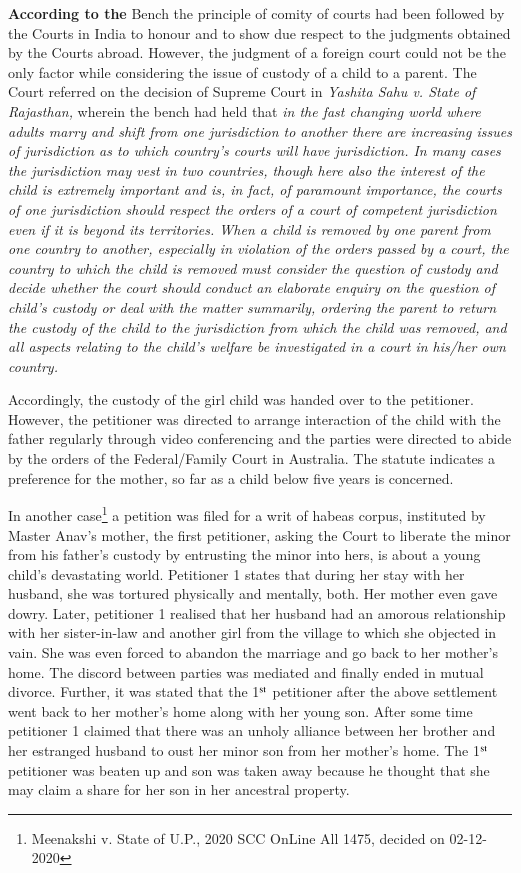 \begin{multicols}{2}
\noi
\textbf{According to the} Bench the principle of comity of courts had been followed by the Courts in
India to honour and to show due respect to the judgments obtained by the Courts abroad.
However, the judgment of a foreign court could not be the only factor while considering the issue
of custody of a child to a parent. The Court referred on the decision of Supreme Court in \textit{Yashita
Sahu v. State of Rajasthan,} wherein the bench had held that \textit{in the fast changing world where
adults marry and shift from one jurisdiction to another there are increasing issues of jurisdiction
as to which country’s courts will have jurisdiction. In many cases the jurisdiction may vest in two
countries, though here also the interest of the child is extremely important and is, in fact, of
paramount importance, the courts of one jurisdiction should respect the orders of a court of
competent jurisdiction even if it is beyond its territories. When a child is removed by one parent
from one country to another, especially in violation of the orders passed by a court, the country
to which the child is removed must consider the question of custody and decide whether the court
should conduct an elaborate enquiry on the question of child’s custody or deal with the matter
summarily, ordering the parent to return the custody of the child to the jurisdiction from which
the child was removed, and all aspects relating to the child’s welfare be investigated in a court
in his/her own country.}

\noi
Accordingly, the custody of the girl child was handed over to the petitioner. However, the
petitioner was directed to arrange interaction of the child with the father regularly through video
conferencing and the parties were directed to abide by the orders of the Federal/Family Court in Australia. The statute indicates a preference for the mother, so far as a child below five years is
concerned.

\noi
In another case\footnote{Meenakshi v. State of U.P., 2020 SCC OnLine All 1475, decided on 02-12-2020} a petition was filed for a writ of habeas corpus, instituted by Master Anav’s
mother, the first petitioner, asking the Court to liberate the minor from his father’s custody by
entrusting the minor into hers, is about a young child’s devastating world. Petitioner 1 states that
during her stay with her husband, she was tortured physically and mentally, both. Her mother
even gave dowry. Later, petitioner 1 realised that her husband had an amorous relationship with
her sister-in-law and another girl from the village to which she objected in vain. She was even
forced to abandon the marriage and go back to her mother’s home. The discord between parties
was mediated and finally ended in mutual divorce. Further, it was stated that the 1$^{\rm st}$ petitioner
after the above settlement went back to her mother’s home along with her young son. After some
time petitioner 1 claimed that there was an unholy alliance between her brother and her estranged
husband to oust her minor son from her mother’s home. The 1$^{\rm st}$ petitioner was beaten up and son was taken away because he thought that she may claim a share for her son in her ancestral property.


\end{multicols}

